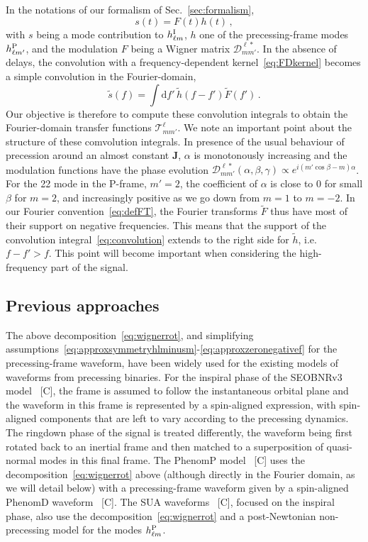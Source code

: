 \documentclass[aps,showpacs,twocolumn,
prd,superscriptaddress,nofootinbib]{revtex4-1}
\newcommand{\be}{\begin{equation}}
\newcommand{\ee}{\end{equation}}
\newcommand\ud{{\mathrm{d}}}
\newcommand\calT{{\mathcal{T}}}
\newcommand\calD{{\mathcal{D}}}
\newcommand{\SM}[1]{{\color{Red} #1}}
\begin{document}
In the notations of our formalism of Sec.~\ref{sec:formalism}, 
\be\label{eq:defmodulationprec}
	s(t) = F(t) h(t) \,,
\ee
with $s$ being a mode contribution to $h^{\rm I}_{\ell m}$, $h$ one of the precessing-frame modes $h^{\rm P}_{\ell m'}$, and the modulation $F$ being a Wigner matrix $\calD^{\ell *}_{mm'}$. In the absence of delays, the convolution with a frequency-dependent kernel~\eqref{eq:FDkernel} becomes a simple convolution in the Fourier-domain,
\be\label{eq:convolution}
	\tilde{s} (f) = \int \ud f' \, \tilde{h}(f-f') \tilde{F} (f') \,.
\ee
Our objective is therefore to compute these convolution integrals to obtain the Fourier-domain transfer functions $\calT^{\ell}_{mm'}$. We note an important point about the structure of these comvolution integrals. In presence of the usual behaviour of precession around an almost constant $\bm{J}$, $\alpha$ is monotonously increasing and the modulation functions have the phase evolution $\calD^{\ell *}_{mm'} (\alpha, \beta, \gamma) \propto e^{i(m' \cos\beta - m) \alpha}$. For the 22 mode in the P-frame, $m'=2$, the coefficient of $\alpha$ is close to $0$ for small $\beta$ for $m=2$, and increasingly positive as we go down from $m=1$ to $m=-2$. In our Fourier convention~\eqref{eq:defFT}, the Fourier transforms $\tilde{F}$ thus have most of their support on negative frequencies. This means that the support of the convolution integral~\eqref{eq:convolution} extends to the right side for $\tilde{h}$, i.e. $f-f' > f$. This point will become important when considering the high-frequency part of the signal.

\subsection{Previous approaches}
\label{subsec:precpreviousapproaches}

The above decomposition~\eqref{eq:wignerrot}, and simplifying assumptions~\eqref{eq:approxsymmetryhlminusm}-\eqref{eq:approxzeronegativef} for the precessing-frame waveform, have been widely used for the existing models of waveforms from precessing binaries. For the inspiral phase of the SEOBNRv3 model~\cite{} \SM{[C]}, the frame is assumed to follow the instantaneous orbital plane and the waveform in this frame is represented by a spin-aligned expression, with spin-aligned components that are left to vary according to the precessing dynamics. The ringdown phase of the signal is treated differently, the waveform being first rotated back to an inertial frame and then matched to a superposition of quasi-normal modes in this final frame. The PhenomP model~\cite{} \SM{[C]} uses the decomposition~\eqref{eq:wignerrot} above (although directly in the Fourier domain, as we will detail below) with a precessing-frame waveform given by a spin-aligned PhenomD waveform~\cite{} \SM{[C]}. The SUA waveforms~\cite{} \SM{[C]}, focused on the inspiral phase, also use the decomposition~\eqref{eq:wignerrot} and a post-Newtonian non-precessing model for the modes $h_{\ell m}^{\rm P}$.
\end{document}
